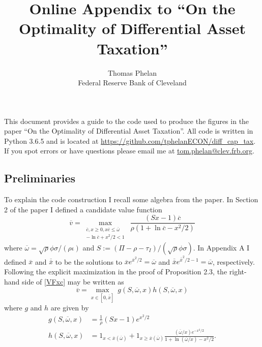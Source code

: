 \documentclass[11pt]{article}
\theoremstyle{plain}
\theoremstyle{definition} %
\begin{document}
\title{Online Appendix to ``On the Optimality of Differential Asset Taxation''}

\author{Thomas Phelan \\ Federal Reserve Bank of Cleveland}
\maketitle

This document provides a guide to the code used to produce the figures in the paper ``On the Optimality of Differential Asset Taxation''. All code is written in Python 3.6.5 and is located at \href{https://github.com/tphelanECON/diff\_cap\_tax}{https://github.com/tphelanECON/diff\_cap\_tax}. If you spot errors or have questions please email me at \href{tom.phelan@clev.frb.org}{tom.phelan@clev.frb.org}. 

\subsection*{Preliminaries}

To explain the code construction I recall some algebra from the paper. In Section 2 of the paper I defined a candidate value function 
\begin{equation}
\overline{v} = \max_{\substack{\overline{c}, x\geq 0, x\overline{c} \leq \overline{\omega} \\ -\ln \overline{c} + x^2/2<1}} \ \frac{(Sx - 1)\overline{c}}{\rho(1 + \ln \overline{c} - x^2/2)}
\label{VFxc}
\end{equation}
where $\overline{\omega} = \sqrt{\rho}\phi\sigma/(\rho \iota)$ and $S := (\Pi - \rho - \tau_I)/(\sqrt{\rho}\phi \sigma)$. In Appendix A I defined $\overline{x}$ and $\overline{\overline{x}}$ to be the solutions to $\overline{x}e^{\overline{x}^2/2} = \overline{\omega}$ and $\overline{\overline{x}}e^{\overline{\overline{x}}^2/2-1} = \overline{\omega}$, respectively. Following the explicit maximization in the proof of Proposition 2.3, the right-hand side of \eqref{VFxc} may be written as
\begin{equation}
\overline{v} = \max_{x\in [0,\overline{\overline{x}}]} \ g(S,\overline{\omega}, x)h(S,\overline{\omega}, x)
\label{VFxc2}
\end{equation}
where $g$ and $h$ are given by
\begin{equation}
\begin{aligned}
g(S,\overline{\omega}, x) & = \frac{1}{\rho}(Sx-1)e^{x^2/2}
\\ h(S,\overline{\omega}, x) & = 1_{x < \overline{x}(\overline{\omega})} + 
1_{x \geq \overline{x}(\overline{\omega})}\frac{(\overline{\omega}/x) e^{-x^2/2}}{1 + \ln(\overline{\omega}/x) - x^2/2}.
\end{aligned}
\label{gh}
\end{equation}
\end{document}
